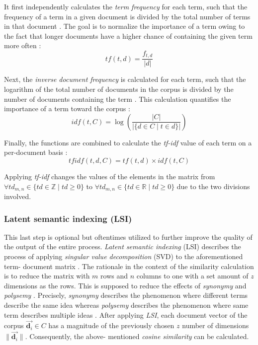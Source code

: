 \documentclass[12pt,a4paper]{report}
\begin{document}
It first independently calculates the \textit{term frequency} for each term,
such that the frequency of a term in a given document is divided by the total
number of terms in that document \cite{robertson2004tfidf}. The goal is to
normalize the importance of a term owing to the fact that longer documents have
a higher chance of containing the given term more often \cite{singhal2001ir}:
\[
  tf(t,d) = \frac{f_{t, d}}{\vert d \vert}
\]

Next, the \textit{inverse document frequency} is calculated for each term, such
that the logarithm of the total number of documents in the corpus is divided by
the number of documents containing the term \cite{robertson2004tfidf}. This
calculation quantifies the importance of a term toward the corpus \cite{singhal2001ir}:
\[
  idf(t,C) = \log \left(\frac{\vert C \vert}{\vert \{d \in C \mid t \in d\} \vert}\right)
\]

Finally, the functions are combined to calculate the \textit{tf-idf} value of
each term on a per-document basis \cite{robertson2004tfidf}:
\[
  tfidf(t,d,C) = tf(t,d) \times idf(t,C)
\]

Applying \textit{tf-idf} changes the values of the elements in the matrix from
\(\forall td_{m,n} \in \{td \in \mathbb{Z} \mid td \ge 0\}\) to
\(\forall td_{m,n} \in \{td \in \mathbb{R} \mid td \ge 0\}\) due to the
two divisions involved.


\subsubsection{Latent semantic indexing (LSI)}
This last step is optional but
oftentimes utilized to further improve the quality of the output of the entire
process. \textit{Latent semantic indexing} (LSI) describes the process of
applying \textit{singular value decomposition} (SVD) to the aforementioned term\hyp
document matrix \cite{deerwester1990lsi}. The rationale in the context of the
similarity calculation is to reduce the matrix with \(m\) rows and \(n\)
columns to one with a set amount of \(z\) dimensions as the rows. This is
supposed to reduce the effects of \textit{synonymy} and \textit{polysemy}
\cite{deerwester1990lsi}.
Precisely, \textit{synonymy} describes the phenomenon where
different terms describe the same idea \cite{press2011oxford} whereas
\textit{polysemy} describes the phenomenon where same term describes
multiple ideas \cite{press2011oxford}.
After applying \textit{LSI}, each document vector of
the corpus \(\vec{\mathbf d_i} \in C\) has a magnitude of the previously chosen
\(z\) number of dimensions \(\|\vec{\mathbf d_i}\|\). Consequently, the above\hyp
mentioned \textit{cosine similarity} can be calculated.
\end{document}
